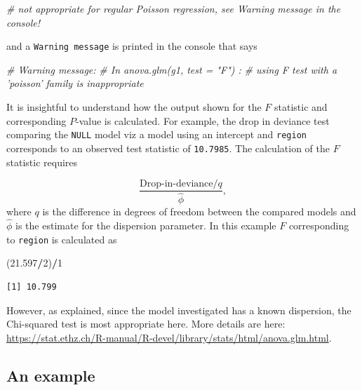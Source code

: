 \documentclass[
]{book}
\newenvironment{Shaded}{\begin{snugshade}}{\end{snugshade}}
\newcommand{\CommentTok}[1]{\textcolor[rgb]{0.56,0.35,0.01}{\textit{#1}}}
\newcommand{\DecValTok}[1]{\textcolor[rgb]{0.00,0.00,0.81}{#1}}
\newcommand{\FloatTok}[1]{\textcolor[rgb]{0.00,0.00,0.81}{#1}}
\newcommand{\NormalTok}[1]{#1}
\newcommand{\OperatorTok}[1]{\textcolor[rgb]{0.81,0.36,0.00}{\textbf{#1}}}
\begin{document}
\begin{Shaded}
\begin{Highlighting}[]
\CommentTok{# not appropriate for regular Poisson regression, see Warning message in the console!}
\end{Highlighting}
\end{Shaded}

and a \texttt{Warning\ message} is printed in the console that says

\begin{Shaded}
\begin{Highlighting}[]
\CommentTok{# Warning message:}
\CommentTok{# In anova.glm(g1, test = "F") :}
\CommentTok{#   using F test with a 'poisson' family is inappropriate}
\end{Highlighting}
\end{Shaded}

It is insightful to understand how the output shown for the \(F\) statistic and corresponding \(P\)-value is calculated. For example, the drop in deviance test comparing the \texttt{NULL} model viz a model using an intercept and \texttt{region} corresponds to an observed test statistic of \texttt{10.7985}. The calculation of the \(F\) statistic requires

\[ \frac{\text{Drop-in-deviance}/q}{\hat{\phi}},  \]
where \(q\) is the difference in degrees of freedom between the compared models and \(\hat{\phi}\) is the estimate for the dispersion parameter. In this example \(F\) corresponding to \texttt{region} is calculated as

\begin{Shaded}
\begin{Highlighting}[]
\NormalTok{(}\FloatTok{21.597}\OperatorTok{/}\DecValTok{2}\NormalTok{)}\OperatorTok{/}\DecValTok{1}
\end{Highlighting}
\end{Shaded}

\begin{verbatim}
[1] 10.799
\end{verbatim}

However, as explained, since the model investigated has a known dispersion, the Chi-squared test is most appropriate here. More details are here: \url{https://stat.ethz.ch/R-manual/R-devel/library/stats/html/anova.glm.html}.

\hypertarget{an-example}{%
\subsection{An example}\label{an-example}}
\end{document}
